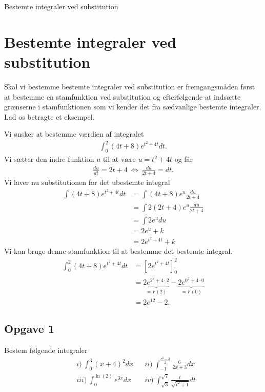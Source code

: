 \begin{center}
\Huge
	Bestemte integraler ved substitution		
\end{center}

\section*{Bestemte integraler ved substitution}

Skal vi bestemme bestemte integraler ved substitution er fremgangsmåden først at bestemme en stamfunktion ved substitution og efterfølgende at indsætte grænserne i stamfunktionen som vi kender det fra sædvanlige bestemte integraler. Lad os betragte et eksempel.

\begin{exa}
	Vi ønsker at bestemme værdien af integralet
	\begin{align*}
		\int_0^2(4t+8)e^{t^2+4t} dt.
	\end{align*}
	Vi sætter den indre funktion $u$ til at være $u = t^2 + 4t$ og får
	\begin{align*}
		\frac{du}{dt} = 2t + 4 \ \Leftrightarrow	\ \frac{du}{2t+4} = dt. 
	\end{align*}
	Vi laver nu substitutionen for det ubestemte integral
	\begin{align*}
		\int (4t + 8)e^{t^2 + 4t} dt &= \int (4t + 8)e^u \frac{du}{2t+4} \\
		&=\int 2(2t + 4)e^u \frac{du}{2t + 4} \\
		&= \int 2e^u du \\
		&= 2e^u + k \\
		&= 2e^{t^2+4t} + k
	\end{align*}
	Vi kan bruge denne stamfunktion til at bestemme det bestemte integral.
	\begin{align*}
		\int_0^2(4t+8)e^{t^2+4t} dt &= \left[ 2e^{t^2+4t} \right]_0^2 \\
		&=\underbrace{2e^{2^2+4\cdot 2}}_{=F(2)} - \underbrace{2e^{0^2+4\cdot 0}}_{=F(0)} \\
		&= 2e^{12}-2.
	\end{align*}
\end{exa}

\subsection*{Opgave 1}
Bestem følgende integraler
\begin{align*}
	&i) \ \int_0^3 (x+4)^2 dx & &ii) \ \int_{-1}^{\frac{e^2-3}{2}}\frac{6}{2x+3}  dx \\
	&iii) \ \int_0^{\ln(2)} e^{3x} dx & &iv) \ \int_{\sqrt{3}}^{\sqrt{7}} \frac{t}{\sqrt{t^2+1}} dt \\
\end{align*}
